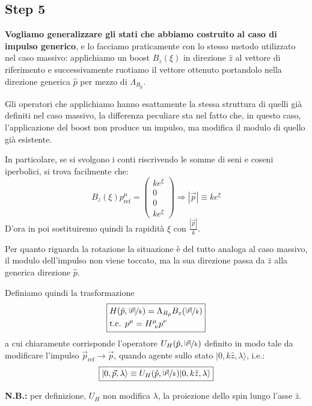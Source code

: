 \documentclass[../main.tex]{subfiles}
\begin{document}
\subsection{Step 5}

\textbf{Vogliamo generalizzare gli stati che abbiamo costruito al caso di impulso generico}, e lo facciamo praticamente con lo stesso metodo utilizzato nel caso massivo: applichiamo un boost $B_z(\xi)$ in direzione $\hat{z}$ al vettore di riferimento e successivamente ruotiamo il vettore ottenuto portandolo nella direzione generica $\hat p$ per mezzo di $\Lambda_{R_{\hat{p}}}$.

Gli operatori che applichiamo hanno esattamente la stessa struttura di quelli già definiti nel caso massivo, la differenza peculiare sta nel fatto che, in questo caso, l'applicazione del boost non produce un impulso, ma modifica il modulo di quello già esistente.

In particolare, se si svolgono i conti riscrivendo le somme di seni e coseni iperbolici, si trova facilmente che:
\[
B_z(\xi) p^\mu_\text{ref} = \begin{pmatrix} ke^\xi \\ 0 \\ 0 \\ ke^\xi \end{pmatrix} \Rightarrow \boxed{|\Vec{p}| \equiv ke^\xi}
\]
D'ora in poi sostituiremo quindi la rapidità $\xi$ con \(\frac{|\Vec{p}|}{k}\).

Per quanto riguarda la rotazione la situazione è del tutto analoga al caso massivo, il modulo dell'impulso non viene toccato, ma la sua direzione passa da $\hat z$ alla generica direzione $\hat{p}$.

Definiamo quindi la trasformazione 
\[\boxed{
\begin{aligned}
&H(\hat{p}, \nicefrac{|\Vec{p}|}{k}) = \Lambda_{R_{\hat{p}}} B_z(\nicefrac{|\Vec{p}|}{k})\\
&\text{t.c. } p^\mu=H^\mu_{~\nu}p^\nu
\end{aligned}}
\]
a cui chiaramente corrisponde l'operatore \(U_H(\hat{p}, \nicefrac{|\Vec{p}|}{k})\) definito in modo tale da modificare l'impulso \(\Vec p_\text{ref}\rightarrow \Vec{p}\), quando agente sullo stato \(|0, k\hat{z}, \lambda\rangle\), i.e.:
\[
\boxed{|0, \Vec{p}, \lambda\rangle \equiv U_H(\hat{p}, \nicefrac{|\Vec{p}|}{k}) |0, k\hat{z}, \lambda\rangle}
\]

\textbf{N.B.:} per definizione, \(U_H\) non modifica \(\lambda\), la proiezione dello spin lungo l'asse $\hat z$.
\end{document}

